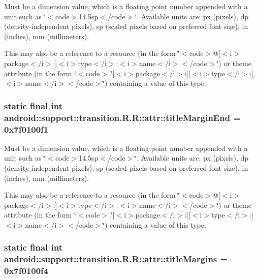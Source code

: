 Must be a dimension value, which is a floating point number appended with a unit such as \char`\"{}$<$code$>$14.5sp$<$/code$>$\char`\"{}. Available units are: px (pixels), dp (density-independent pixels), sp (scaled pixels based on preferred font size), in (inches), mm (millimeters). 

This may also be a reference to a resource (in the form \char`\"{}$<$code$>$@\mbox{[}$<$i$>$package$<$/i$>$:\mbox{]}$<$i$>$type$<$/i$>$:$<$i$>$name$<$/i$>$$<$/code$>$\char`\"{}) or theme attribute (in the form \char`\"{}$<$code$>$?\mbox{[}$<$i$>$package$<$/i$>$:\mbox{]}\mbox{[}$<$i$>$type$<$/i$>$:\mbox{]}$<$i$>$name$<$/i$>$$<$/code$>$\char`\"{}) containing a value of this type. \hypertarget{classandroid_1_1support_1_1transition_1_1_r_1_1attr_b205b3ddc7a53f2316429925ca77dec6}{
\subsubsection[{titleMarginEnd}]{\setlength{\rightskip}{0pt plus 5cm}static final int android::support::transition.R.R::attr::titleMarginEnd = 0x7f0100f1}}
\label{classandroid_1_1support_1_1transition_1_1_r_1_1attr_b205b3ddc7a53f2316429925ca77dec6}


Must be a dimension value, which is a floating point number appended with a unit such as \char`\"{}$<$code$>$14.5sp$<$/code$>$\char`\"{}. Available units are: px (pixels), dp (density-independent pixels), sp (scaled pixels based on preferred font size), in (inches), mm (millimeters). 

This may also be a reference to a resource (in the form \char`\"{}$<$code$>$@\mbox{[}$<$i$>$package$<$/i$>$:\mbox{]}$<$i$>$type$<$/i$>$:$<$i$>$name$<$/i$>$$<$/code$>$\char`\"{}) or theme attribute (in the form \char`\"{}$<$code$>$?\mbox{[}$<$i$>$package$<$/i$>$:\mbox{]}\mbox{[}$<$i$>$type$<$/i$>$:\mbox{]}$<$i$>$name$<$/i$>$$<$/code$>$\char`\"{}) containing a value of this type. \hypertarget{classandroid_1_1support_1_1transition_1_1_r_1_1attr_ecc940104bbff2018d1faecf2bd1b7aa}{
\subsubsection[{titleMargins}]{\setlength{\rightskip}{0pt plus 5cm}static final int android::support::transition.R.R::attr::titleMargins = 0x7f0100f4}}
\label{classandroid_1_1support_1_1transition_1_1_r_1_1attr_ecc940104bbff2018d1faecf2bd1b7aa}


